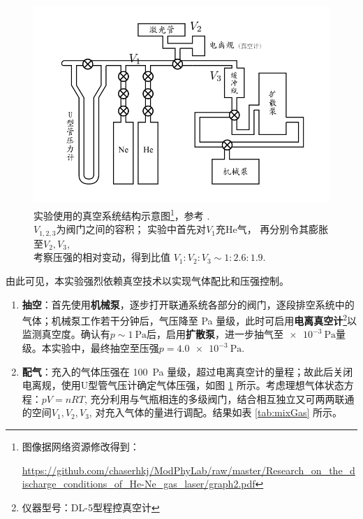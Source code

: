 \documentclass[aps,pre,12pt,preprint,%
	onecolumn,showpacs,showkeys,nofootinbib]{revtex4-1}
\begin{document}
	\begin{figure}[!h]
	\centering
	\vspace{-.5\baselineskip}
	\includegraphics[width=.9\linewidth]{app.png}
	\vspace{-3ex}
	\caption[实验真空系统]{%
		实验使用的真空系统结构示意图\footnote{%
			图像据网络资源修改得到：\par\vspace{-.8ex}
			\noindent\fontsize{7pt}{\parskip}%
			\url{https://github.com/chaserhkj/ModPhyLab/raw/master/Research_on_the_discharge_conditions_of_He-Ne_gas_laser/graph2.pdf}%
		}，参考 \cite{textbook}.\\[1ex]
		$V_{1,2,3}$为阀门之间的容积；
		实验中首先对$V_1$充\textup{He}气，
		再分别令其膨胀至$V_2,V_3$, \\[.3ex]
		考察压强的相对变动，得到比值
		$V_1 : V_2 : V_3 \sim 1 : 2.6 : 1.9$. \vspace{1ex}
	}
	\label{fig:app}
	\end{figure}
\FloatBarrier
	
	由此可见，本实验强烈依赖真空技术以实现气体配比和压强控制。
	\begin{enumerate}
	\item \textbf{抽空}：首先使用\textbf{机械泵}，逐步打开联通系统各部分的阀门，逐段排空系统中的气体；机械泵工作若干分钟后，气压降至 \si{\Pa} 量级，此时可启用\textbf{电离真空计}\footnote{仪器型号：DL-5型程控真空计}以监测真空度。确认有$p\sim\SI{1}{\Pa}$后，启用\textbf{扩散泵}，进一步抽气至$\SI{e-3}{\Pa}$量级。本实验中，最终抽空至压强$p = \SI{4.0e-3}{\Pa}$. 
	\item \textbf{配气}：充入的气体压强在 \SI{100}{\Pa} 量级，超过电离真空计的量程；故此后关闭电离规，使用U型管气压计确定气体压强，如图 \ref{fig:app} 所示。考虑理想气体状态方程：$pV = nRT$, 充分利用与气瓶相连的多级阀门，结合相互独立又可两两联通的空间$V_1,V_2,V_3$, 对充入气体的量进行调配。结果如表 \ref{tab:mixGas} 所示。
	\end{enumerate}
	
\end{document}
